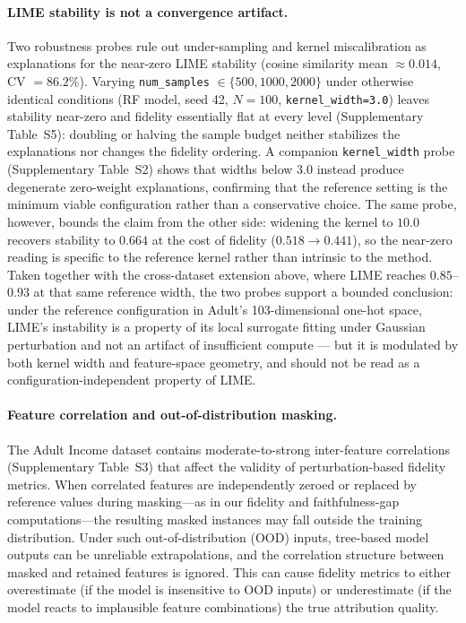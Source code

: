 \documentclass[twoside,11pt]{article}
\begin{document}
\paragraph{LIME stability is not a convergence artifact.}
Two robustness probes rule out under-sampling and kernel miscalibration as
explanations for the near-zero LIME stability (cosine similarity mean
$\approx 0.014$, CV $= 86.2\%$). Varying \texttt{num\_samples} $\in
\{500, 1000, 2000\}$ under otherwise identical conditions (RF model, seed
42, $N=100$, \texttt{kernel\_width=3.0}) leaves stability near-zero and
fidelity essentially flat at every level (Supplementary Table~S5):
doubling or halving the sample budget neither stabilizes the explanations
nor changes the fidelity ordering. A companion \texttt{kernel\_width}
probe (Supplementary Table~S2) shows that widths below $3.0$ instead
produce degenerate zero-weight explanations, confirming that the
reference setting is the minimum viable configuration rather than a
conservative choice. The same probe, however, bounds the claim from the
other side: widening the kernel to $10.0$ recovers stability to $0.664$
at the cost of fidelity ($0.518 \rightarrow 0.441$), so the near-zero
reading is specific to the reference kernel rather than intrinsic to the
method. Taken together with the cross-dataset extension above, where LIME
reaches $0.85$--$0.93$ at that same reference width, the two probes
support a bounded conclusion: under the reference configuration in
Adult's 103-dimensional one-hot space, LIME's instability is a property
of its local surrogate fitting under Gaussian perturbation and not an
artifact of insufficient compute --- but it is modulated by both kernel
width and feature-space geometry, and should not be read as a
configuration-independent property of LIME.

\paragraph{Feature correlation and out-of-distribution masking.}
The Adult Income dataset contains moderate-to-strong inter-feature
correlations (Supplementary Table~S3) that affect the validity of
perturbation-based fidelity metrics. When correlated features are
independently zeroed or replaced by reference values during
masking---as in our fidelity and faithfulness-gap computations---the
resulting masked instances may fall outside the training distribution.
Under such out-of-distribution (OOD) inputs, tree-based model outputs can
be unreliable extrapolations, and the correlation structure between
masked and retained features is ignored. This can cause fidelity metrics
to either overestimate (if the model is insensitive to OOD inputs) or
underestimate (if the model reacts to implausible feature combinations)
the true attribution quality.
\end{document}

